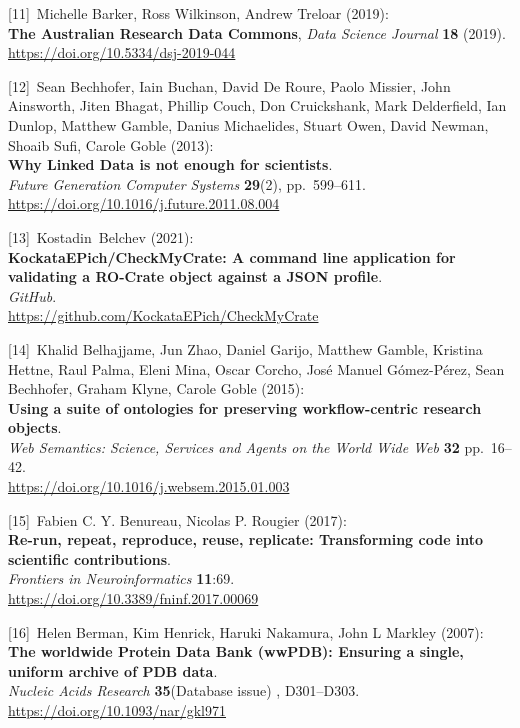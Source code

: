 {[}11{]}~Michelle Barker, Ross Wilkinson, Andrew Treloar (2019):\\
\textbf{The Australian Research Data Commons}, \emph{Data Science
Journal} \textbf{18} (2019).\\
\url{https://doi.org/10.5334/dsj-2019-044}

{[}12{]}~Sean Bechhofer, Iain Buchan, David De Roure, Paolo Missier,
John Ainsworth, Jiten Bhagat, Phillip Couch, Don Cruickshank, Mark
Delderfield, Ian Dunlop, Matthew Gamble, Danius Michaelides, Stuart
Owen, David Newman, Shoaib Sufi, Carole Goble (2013):\\
\textbf{Why Linked Data is not enough for scientists}.\\
\emph{Future Generation Computer Systems} \textbf{29}(2),
pp.~599--611.\\
\url{https://doi.org/10.1016/j.future.2011.08.004}

{[}13{]}~Kostadin~Belchev (2021):\\
\textbf{KockataEPich/CheckMyCrate: A command line application for
validating a RO-Crate object against a JSON profile}.\\
\emph{GitHub}.\\
\url{https://github.com/KockataEPich/CheckMyCrate}

{[}14{]}~Khalid Belhajjame, Jun Zhao, Daniel Garijo, Matthew Gamble,
Kristina Hettne, Raul Palma, Eleni Mina, Oscar Corcho, José Manuel
Gómez-Pérez, Sean Bechhofer, Graham Klyne, Carole Goble (2015):\\
\textbf{Using a suite of ontologies for preserving workflow-centric
research objects}.\\
\emph{Web Semantics: Science, Services and Agents on the World Wide Web}
\textbf{32} pp.~16--42.\\
\url{https://doi.org/10.1016/j.websem.2015.01.003}

{[}15{]}~Fabien C. Y. Benureau, Nicolas P. Rougier (2017):\\
\textbf{Re-run, repeat, reproduce, reuse, replicate: Transforming code
into scientific contributions}.\\
\emph{Frontiers in Neuroinformatics} \textbf{11}:69.\\
\url{https://doi.org/10.3389/fninf.2017.00069}

{[}16{]}~Helen Berman, Kim Henrick, Haruki Nakamura, John L Markley
(2007):\\
\textbf{The worldwide Protein Data Bank (wwPDB): Ensuring a single,
uniform archive of PDB data}.\\
\emph{Nucleic Acids Research} \textbf{35}(Database issue) ,
D301--D303.\\
\url{https://doi.org/10.1093/nar/gkl971}

